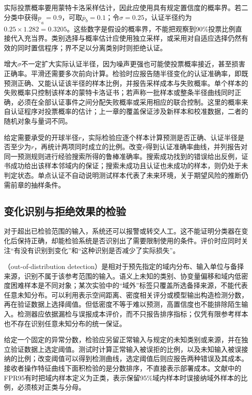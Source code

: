 实际投票概率要用蒙特卡洛采样估计，因此应使用具有规定置信度的概率界。若二分类中获得$\underline p_a=0.9$，可取$\overline p_b=0.1$；令$\sigma=0.25$，认证半径约为$0.25\times1.282=0.3205$。这些数字是假设的概率界，不能把观察到90\%投票比例直接代入充当界。类别选择与概率估计应使用独立采样，或采用对自适应选择仍然有效的同时置信程序；界不足以分离类别时则拒绝认证。

增大$\sigma$不一定扩大实际认证半径，因为噪声更强也可能使投票概率接近，甚至损害正确率。平滑还需要多次前向计算。检验时应报告随半径变化的认证准确率，即既预测正确、又能认证该半径的样本比例，并报告采样成本与失败概率。单个样本的失败概率只控制该样本的蒙特卡洛证书；若声称一批样本或整条半径曲线同时正确，必须在全部认证事件之间分配失败概率或采用相应的联合控制。这里的概率来自认证程序对投票概率的估计；上一章的覆盖保证涉及新样本和校准数据，二者的随机对象与量词不同。

给定需要承受的开球半径$r$，实际检验应逐个样本计算预测是否正确、认证半径是否至少为$r$，再统计两项同时成立的比例。改变$r$得到认证准确率曲线，并列报告对同一预测规则进行经验搜索所得的鲁棒准确率。搜索成功找到的错误给出反例，证书成功给出该样本邻域内的保证；搜索未成功且认证也未成功的样本，则仍处于未判定状态。单点认证不自动说明测试样本代表了未来环境，关于期望风险的推断仍需前章的抽样条件。

\subsection{变化识别与拒绝效果的检验}
\label{sec:robustness-monitor-test}

对于超出已检验范围的输入，系统还可以报警或转交人工。这不能证明分类器在变化后保持正确，却能检验系统是否识别出了需要限制使用的条件。评价时应同时关注“有没有识别到变化”和“这种识别是否减少了实际损失”。

（out-of-distribution detection）是相对于预先指定的域内分布、输入单位与备择来源，识别不属于该参考范围的输入。语义上未知的类别、协变量偏移和域内低密度困难样本是不同对象；某次实验中的“域外”标签只覆盖所选备择来源，不能代表任意未知分布。可以利用表示空间距离、密度相关评分或模型输出构造检测分数，再在验证数据上选择阈值。但低密度不等于难以预测，高置信度也不能排除陌生输入。检测器应依据漏检与误报成本评价，而不只报告排序指标；仅凭有限参考样本也不存在识别任意未知分布的统一保证。

给定一个固定的异常分数，检验应另留正常输入与规定的未知类别或来源，并在独立验证数据上选定阈值。测试时计算正常输入被误拒的比例，以及未知输入被误接纳的比例；改变阈值可以得到检测曲线，选定阈值后则应报告两种错误及其成本。接收者操作特征曲线下面积检验的是分数排序，不直接表示部署成本。文献中的FPR95有时把域内样本定义为正类，表示保留95\%域内样本时误接纳域外样本的比例，必须核对正类与分母。

